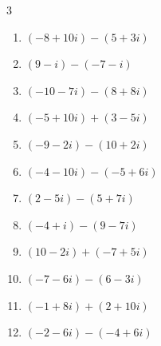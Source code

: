 \begin{multicols}{3}
\begin{enumerate}
        \phantom{$\displaystyle =-10+6i$}

  \item $\displaystyle (-8+10i) - (5+3i)$

        \phantom{$\displaystyle =-13+7i$}

  \item $\displaystyle (9-i) - (-7-i)$

        \phantom{$\displaystyle =16$}

  \item $\displaystyle (-10-7i) - (8+8i)$

        \phantom{$\displaystyle =-18-15i$}

  \item $\displaystyle (-5+10i) + (3-5i)$

        \phantom{$\displaystyle =-2+5i$}

  \item $\displaystyle (-9-2i) - (10+2i)$

        \phantom{$\displaystyle =-19-4i$}

  \item $\displaystyle (-4-10i) - (-5+6i)$

        \phantom{$\displaystyle =1-16i$}

\columnbreak %

\resetques

  \item $\displaystyle (2-5i) - (5+7i)$

        \phantom{$\displaystyle =-3-12i$}

  \item $\displaystyle (-4+i) - (9-7i)$

        \phantom{$\displaystyle =-13+8i$}

  \item $\displaystyle (10-2i) + (-7+5i)$

        \phantom{$\displaystyle =3+3i$}

  \item $\displaystyle (-7-6i) - (6-3i)$

        \phantom{$\displaystyle =-13-3i$}

  \item $\displaystyle (-1+8i) + (2+10i)$

        \phantom{$\displaystyle =1+18i$}

  \item $\displaystyle (-2-6i) - (-4+6i)$

        \phantom{$\displaystyle =2-12i$}


\end{enumerate}
\end{multicols}
